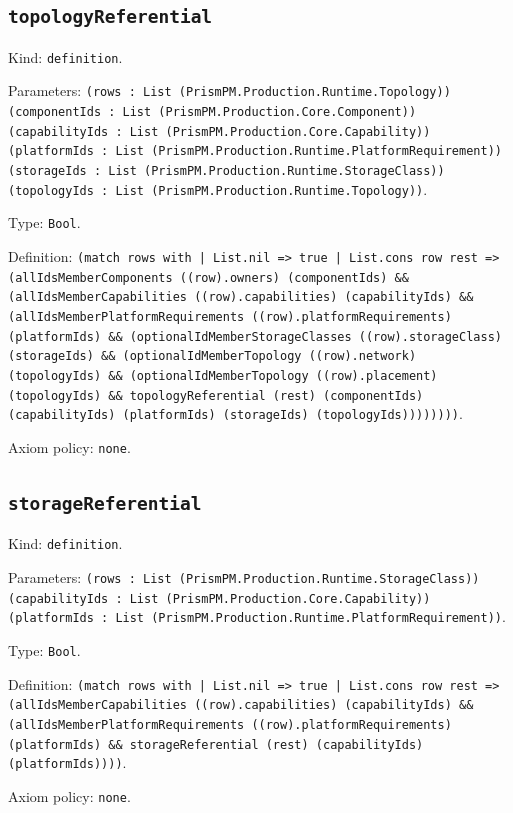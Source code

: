 \documentclass[11pt]{article}
\begin{document}
\subsection*{\texttt{topologyReferential}}
\noindent Kind: \texttt{definition}.\par
\noindent Parameters: \texttt{(rows : List (PrismPM.Production.Runtime.Topology)) (componentIds : List (PrismPM.Production.Core.Component)) (capabilityIds : List (PrismPM.Production.Core.Capability)) (platformIds : List (PrismPM.Production.Runtime.PlatformRequirement)) (storageIds : List (PrismPM.Production.Runtime.StorageClass)) (topologyIds : List (PrismPM.Production.Runtime.Topology))}.\par
\noindent Type: \texttt{Bool}.\par
\noindent Definition: \texttt{(match rows with | List.nil => true | List.cons row rest => (allIdsMemberComponents ((row).owners) (componentIds) \&\& (allIdsMemberCapabilities ((row).capabilities) (capabilityIds) \&\& (allIdsMemberPlatformRequirements ((row).platformRequirements) (platformIds) \&\& (optionalIdMemberStorageClasses ((row).storageClass) (storageIds) \&\& (optionalIdMemberTopology ((row).network) (topologyIds) \&\& (optionalIdMemberTopology ((row).placement) (topologyIds) \&\& topologyReferential (rest) (componentIds) (capabilityIds) (platformIds) (storageIds) (topologyIds))))))))}.\par
\noindent Axiom policy: \texttt{none}.\par
\subsection*{\texttt{storageReferential}}
\noindent Kind: \texttt{definition}.\par
\noindent Parameters: \texttt{(rows : List (PrismPM.Production.Runtime.StorageClass)) (capabilityIds : List (PrismPM.Production.Core.Capability)) (platformIds : List (PrismPM.Production.Runtime.PlatformRequirement))}.\par
\noindent Type: \texttt{Bool}.\par
\noindent Definition: \texttt{(match rows with | List.nil => true | List.cons row rest => (allIdsMemberCapabilities ((row).capabilities) (capabilityIds) \&\& (allIdsMemberPlatformRequirements ((row).platformRequirements) (platformIds) \&\& storageReferential (rest) (capabilityIds) (platformIds))))}.\par
\noindent Axiom policy: \texttt{none}.\par
\end{document}
